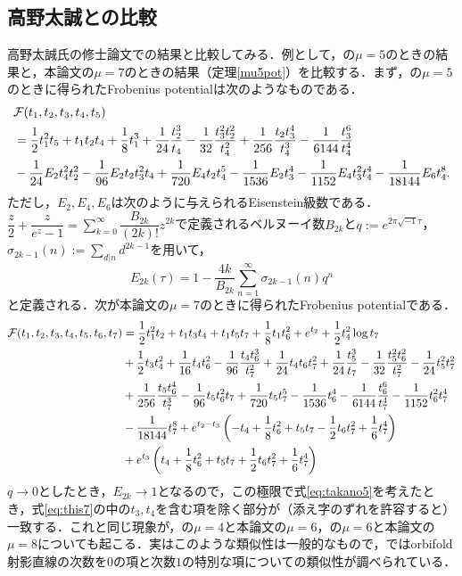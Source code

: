 \documentclass[a4paper,11pt]{jbook}
\theoremstyle{plain}
\theoremstyle{definition}
\theoremstyle{remark}
\theoremstyle{proof}
\numberwithin{equation}{section}
\def\F{{\mathcal F}}
\begin{document}
\subsection{高野太誠\cite{takano}との比較}

	高野太誠氏の修士論文\cite{takano}での結果と比較してみる．例として，\cite{takano}の$\mu=5$のときの結果と，本論文の$\mu=7$のときの結果（定理\ref{mu5pot}）を比較する．まず，\cite{takano}の$\mu=5$のときに得られたFrobenius potentialは次のようなものである．
\begin{align}
	&\F(t_1, t_2, t_3, t_4, t_5) \notag \\
	&= \dfrac{1}{2}t_1^2t_5+t_1t_2t_4+\dfrac{1}{8}t_1^3+\frac{1}{24}\frac{t_2^3}{t_4}-\frac{1}{32}\frac{t_3^2t_2^2}{t_4^2}+\frac{1}{256}\frac{t_2t_3^4}{t_4^3}-\frac{1}{6144}\frac{t_3^6}{t_4^4} \notag \\
	&-\frac{1}{24}E_2t_4^2t_2^2-\frac{1}{96}E_2t_2t_3^2t_4+\frac{1}{720}E_4t_2t_4^5-\frac{1}{1536}E_2t_3^4-\frac{1}{1152}E_4t_3^2t_4^4-\frac{1}{18144}E_6t_4^8. \label{eq:takano5}
\end{align}
ただし，$E_{2}, E_{4}, E_{6}$は次のように与えられるEisenstein級数である．$\dfrac{z}{2}+\dfrac{z}{e^z-1}=\sum_{k=0}^{\infty}\dfrac{B_{2k}}{(2k)!}z^{2k}$で定義されるベルヌーイ数$B_{2k}$と$q:=e^{2\pi\sqrt{-1}\tau}$，$\sigma_{2k-1}(n):=\sum_{d|n}d^{2k-1}$を用いて，$$E_{2k}(\tau)=1-\dfrac{4k}{B_{2k}}\sum_{n=1}^{\infty}\sigma_{2k-1}(n)q^n$$
と定義される．次が本論文の$\mu=7$のときに得られたFrobenius potentialである．
\begin{align}
	\F(t_1,t_2,t_3,t_4,t_5,t_6,t_7)&=\frac{1}{2}t_1^2t_2 +t_1t_3t_4 +t_1t_5t_7 +\frac{1}{8}t_1t_6^2 +e^{t_2}+\dfrac{1}{2}t_4^2\log{t_7} \notag \\
&+\dfrac{1}{2}t_3t_4^2+\frac{1}{16}t_4t_6^2-\dfrac{1}{96}\frac{t_4t_6^3}{t_7^2}+\dfrac{1}{24}t_4t_6t_7^2 +\frac{1}{24}\frac{t_5^3}{t_7} -\frac{1}{32}\frac{t_5^2t_6^2}{t_7^2}-\frac{1}{24}t_5^2t_7^2 \notag \\
&+\frac{1}{256}\frac{t_5t_6^4}{t_7^3}-\frac{1}{96}t_5t_6^2t_7 +\frac{1}{720}t_5t_7^5 -\frac{1}{1536}t_6^4-\frac{1}{6144}\frac{t_6^6}{t_7^4} -\frac{1}{1152}t_6^2t_7^4  \notag \\
&-\frac{1}{18144}t_7^8+e^{t_2-t_3}\left(-t_4+\frac{1}{8}t_6^2+t_5t_7-\frac{1}{2}t_6t_7^2+\frac{1}{6}t_7^4 \right) \notag \\
&+e^{t_3}\left(t_4+\frac{1}{8}t_6^2+t_5t_7+\frac{1}{2}t_6t_7^2+\frac{1}{6}t_7^4 \right) \label{eq:this7}
\end{align}
$q\rightarrow0$としたとき，$E_{2k}\rightarrow1$となるので，この極限で式\eqref{eq:takano5}を考えたとき，式\eqref{eq:this7}の中の$t_3, t_4$を含む項を除く部分が（添え字のずれを許容すると）一致する．これと同じ現象が，\cite{takano}の$\mu=4$と本論文の$\mu=6$，\cite{takano}の$\mu=6$と本論文の$\mu=8$についても起こる．実はこのような類似性は一般的なもので，\cite{shir}ではorbifold射影直線の次数を$0$の項と次数$1$の特別な項についての類似性が調べられている．
\end{document}
